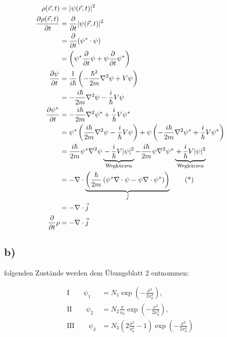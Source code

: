     \begin{align*}
        \rho(\vec{r},t) &= \lvert\psi(\vec{r},t)\rvert^2\\
        \frac{\partial\rho(\vec{r},t)}{\partial t} &= \frac{\partial}{\partial t} \lvert\psi(\vec{r},t)\rvert^2\\
        &= \frac{\partial}{\partial t} (\psi^* \cdot \psi)\\
        &= \left( \psi^* \frac{\partial}{\partial t} \psi + \psi \frac{\partial}{\partial t} \psi^* \right)\\
        \frac{\partial \psi}{\partial t} &= \frac{1}{i\hbar} \left( -\frac{\hbar^2}{2m} \nabla^2 \psi + V\psi \right)\\
        &= - \frac{i\hbar}{2m}\nabla^2 \psi - \frac{i}{\hbar} V \psi\\
        \frac{\partial \psi^*}{\partial t} &= -\frac{i\hbar}{2m} \nabla^2 \psi^* + \frac{i}{\hbar} V \psi^*\\
        &= \psi^* \left( \frac{i\hbar}{2m} \nabla^2 \psi - \frac{i}{\hbar} V \psi \right) + \psi \left( -\frac{i\hbar}{2m} \nabla^2 \psi^* + \frac{i}{\hbar} V \psi^* \right)\\
        &= \frac{i\hbar}{2m} \psi^* \nabla^2 \psi \underbrace{\,-\,\frac{i}{\hbar} V \lvert\psi\rvert^2}_{\text{Wegk\"urzen}} - \frac{i\hbar}{2m} \psi \nabla^2 \psi^* \underbrace{\,+\,\frac{i}{\hbar} V \lvert\psi\rvert^2}_{\text{Wegk\"urzen}}\\
        &= - \nabla \cdot \underbrace{\left( \frac{\hbar}{2m} \left( \psi^* \nabla \cdot \psi - \psi \nabla \cdot \psi^* \right) \right)}_{\vec{j}} \tag{*}\\
        &= - \nabla \cdot \vec{j}\\
        \frac{\partial}{\partial t}\rho &= -\nabla \cdot \vec{j} 
    \end{align*}

\newpage
\subsection{b)}

    \justifying folgenden Zustände werden dem Übungsblatt 2 entnommen:

    \noindent\makebox[\linewidth]{\rule{\textwidth}{1pt}}
    \begin{align*}
        \text{I} \qquad \psi_1 &= N_1 \exp \left(-\frac{x^2}{2x_0^2} \right),\\
        \text{II} \qquad \psi_2 &= N_2 \frac{x}{x_0} \exp \left( -\frac{x^2}{2x_0^2} \right),\\
        \text{III} \qquad \psi_3 &= N_3 \left( 2\frac{x^2}{x_0^2}-1 \right) \exp \left( -\frac{x^2}{2x_0^2} \right)
    \end{align*}
    \noindent\makebox[\linewidth]{\rule{\textwidth}{1pt}}

